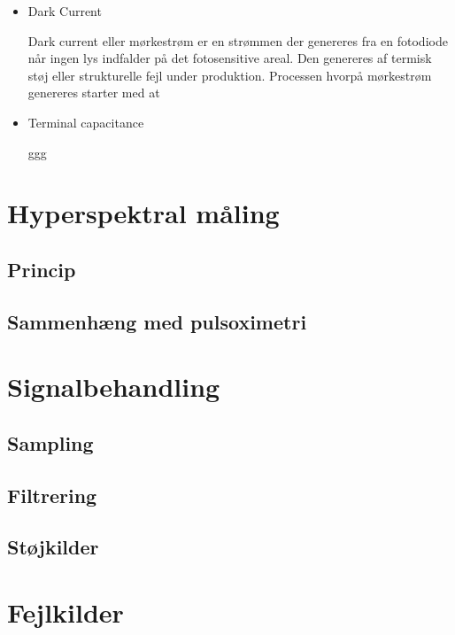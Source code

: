 \begin{itemize}
Almindeligt, vælges en fotodiode blandt andet ud fra den højeste $\text{Fotosensitivitet} = \frac{\text{Ampere}}{\text{Watt}}$, ved dette punkt produceres der mest strømstyrke per radiant exitans. 

    \item Dark Current

Dark current eller mørkestrøm er en strømmen der genereres fra en fotodiode når ingen lys indfalder på det fotosensitive areal. Den genereres af termisk støj eller strukturelle fejl under produktion. Processen hvorpå mørkestrøm genereres starter med at 
    
    \item Terminal capacitance

ggg
    
\end{itemize}



\section{Hyperspektral måling}
    \subsection{Princip}
    \subsection{Sammenhæng med pulsoximetri}

\section{Signalbehandling}
\label{sec:signalbehandling}

\subsection{Sampling}
\label{sec:sampling}

\subsection{Filtrering}
\label{sec:filtrering}

\subsection{Støjkilder}
\label{sec:støjkilder}



\section{Fejlkilder}
\label{sec:fejlkilder}
